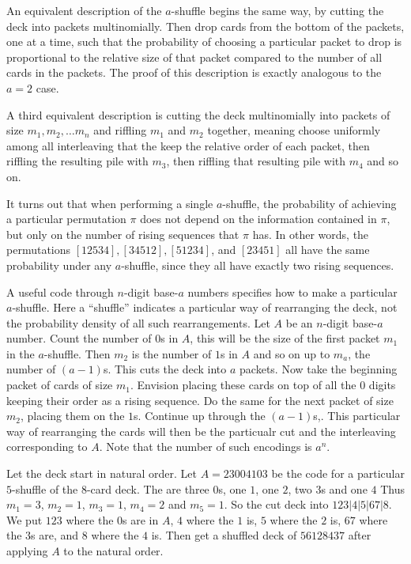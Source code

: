 \documentclass[12pt]{article}
\begin{document}
An equivalent description of the \( a \)-shuffle begins the same way, by
cutting the deck into packets multinomially.  Then drop cards from the
bottom of the packets, one at a time, such that the probability of
choosing a particular packet to drop is proportional to the relative
size of that packet compared to the number of all cards in the packets.
The proof of this description is exactly analogous to the \( a = 2 \)
case.

A third equivalent description is cutting the deck multinomially into
packets of size \( m_1, m_2, \dots m_n \) and riffling \( m_1 \) and \(
m_2 \) together, meaning choose uniformly among all interleaving that
the keep the relative order of each packet, then riffling the resulting
pile with \( m_3 \), then riffling that resulting pile with \( m_4 \)
and so on.

It turns out that when performing a single \( a \)-shuffle, the
probability of achieving a particular permutation \( \pi \) does not
depend on the information contained in \( \pi \), but only on the number
of rising sequences that \( \pi \) has.  In other words, the
permutations \( [12534], [34512], [51234] \), and \( [23451] \) all have
the same probability under any \( a \)-shuffle, since they all have
exactly two rising sequences.

A useful code through \( n \)-digit base-\( a \) numbers specifies how
to make a particular \( a \)-shuffle.  Here a ``shuffle'' indicates a
particular way of rearranging the deck, not the probability density of
all such rearrangements.  Let \( A \) be an \( n \)-digit base-\( a \)
number. Count the number of \( 0 \)s in \( A \), this will be the size
of the first packet \( m_1 \) in the \( a \)-shuffle.  Then \( m_2 \) is
the number of \( 1 \)s in \( A \) and so on up to \( m_a \), the number
of \( (a-1) \)s.  This cuts the deck into \( a \) packets.  Now take the
beginning packet of cards of size \( m_1 \).  Envision placing these
cards on top of all the \( 0 \) digits keeping their order as a rising
sequence.  Do the same for the next packet of size \( m_2 \), placing
them on the \( 1 \)s.  Continue up through the \( (a-1) \)s,.  This
particular way of rearranging the cards will then be the particualr cut
and the interleaving corresponding to \( A \).  Note that the number of
such encodings is \( a^n \).

\begin{example}
    Let the deck start in natural order.  Let \( A = 23004103 \) be the
    code for a particular \( 5 \)-shuffle of the \( 8 \)-card deck.  The
    are three \( 0 \)s, one \( 1 \), one \( 2 \), two \( 3 \)s and one \(
    4 \) Thus \( m_1 = 3 \), \( m_2 = 1 \), \( m_3 =1 \), \( m_4 = 2 \)
    and \( m_5 = 1 \).  So the cut deck into \( 123|4|5|67|8 \).  We put
    \( 123 \) where the \( 0 \)s are in \( A \), \( 4 \) where the \( 1 \)
    is, \( 5 \) where the \( 2 \) is, \( 67 \) where the \( 3 \)s are,
    and \( 8 \) where the \( 4 \) is.  Then get a shuffled deck of \(
    56128437 \) after applying \( A \) to the natural order.
\end{example}
\end{document}
